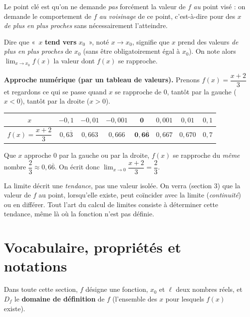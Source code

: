 \documentclass[11pt,a4paper]{article}
\begin{document}
Le point clé est qu'on ne demande \emph{pas} forcément la valeur de $f$ \emph{au} point visé : on
demande le comportement de $f$ \emph{au voisinage} de ce point, c'est-à-dire pour des $x$
\emph{de plus en plus proches} sans nécessairement l'atteindre.

\begin{definition}
Dire que «~$x$ \textbf{tend vers} $x_0$~», noté $x\to x_0$, signifie que $x$ prend des valeurs
\emph{de plus en plus proches} de $x_0$ (sans être obligatoirement égal à $x_0$).
On note alors $\displaystyle\lim_{x\to x_0} f(x)$ la valeur dont $f(x)$ se rapproche.
\end{definition}

\noindent\textbf{Approche numérique (par un tableau de valeurs).}
Prenons $f(x)=\dfrac{x+2}{3}$ et regardons ce qui se passe quand $x$ se rapproche de $0$,
tantôt par la gauche ($x<0$), tantôt par la droite ($x>0$).

\begin{center}
\renewcommand{\arraystretch}{1.25}
\begin{tabular}{c|ccc|c|ccc}
\toprule
$x$ & $-0{,}1$ & $-0{,}01$ & $-0{,}001$ & $\mathbf{0}$ & $0{,}001$ & $0{,}01$ & $0{,}1$\\
\midrule
$f(x)=\dfrac{x+2}{3}$ & $0{,}6\overline{3}$ & $0{,}663$ & $0{,}666$ & $\mathbf{0{,}6\overline{6}}$ & $0{,}667$ & $0{,}670$ & $0{,}7$\\
\bottomrule
\end{tabular}
\end{center}

Que $x$ approche $0$ par la gauche ou par la droite, $f(x)$ se rapproche du \emph{même} nombre
$\dfrac{2}{3}\approx 0{,}6\overline{6}$. On écrit donc $\displaystyle\lim_{x\to 0}\dfrac{x+2}{3}=\dfrac{2}{3}$.

\begin{remarque}
La limite décrit une \emph{tendance}, pas une valeur isolée. On verra (section 3) que la valeur
de $f$ au point, lorsqu'elle existe, peut coïncider avec la limite (\emph{continuité}) ou en
différer. Tout l'art du calcul de limites consiste à déterminer cette tendance, même là où la
fonction n'est pas définie.
\end{remarque}

\section{Vocabulaire, propriétés et notations}
Dans toute cette section, $f$ désigne une fonction, $x_0$ et $\ell$ deux nombres réels, et
$D_f$ le \textbf{domaine de définition} de $f$ (l'ensemble des $x$ pour lesquels $f(x)$ existe).
\end{document}
